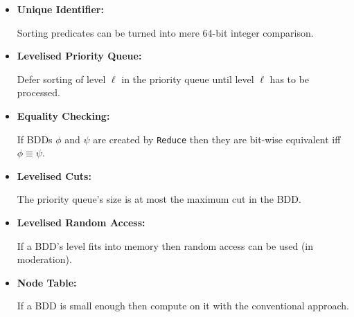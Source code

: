 \documentclass[english, aspectratio=169]{beamer}
\begin{document}
\blankframe

\begin{frame}
  \begin{itemize}
  \item \textbf{Unique Identifier:}

    \small Sorting predicates can be turned into mere 64-bit integer
    comparison.

  \item \textbf{Levelised Priority Queue:}

    \small Defer sorting of level $\ell$ in the priority queue until level
    $\ell$ has to be processed.

  \item \textbf{Equality Checking:}

    \small If BDDs $\phi$ and $\psi$ are created by \texttt{Reduce} then they
    are bit-wise equivalent iff $\phi \equiv \psi$.

  \item \textbf{Levelised Cuts:}

    \small The priority queue's size is at most the maximum cut in the BDD.

  \item \textbf{Levelised Random Access:}

    \small If a BDD's level fits into memory then random access can be used (in
    moderation).

  \item \textbf{Node Table:}

    \small If a BDD is small enough then compute on it with the conventional
    approach.
  \end{itemize}
\end{frame}
\end{document}
